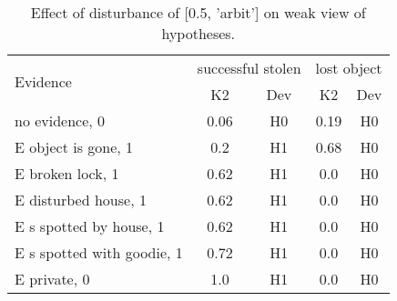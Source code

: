 \begin{table}\begin{tabular}{l|cc|cc}\toprule\multirow{2}{*}{Evidence} & \multicolumn{2}{c}{successful stolen}& \multicolumn{2}{c}{lost object}\\& {K2} & {Dev}& {K2} & {Dev}\\\midrule
no evidence, 0 & \cellcolor{Bittersweet}0.06&\cellcolor{Bittersweet}H0&\cellcolor{Bittersweet}0.19&\cellcolor{Bittersweet}H0\\E object is gone, 1 & \cellcolor{Bittersweet}0.2&\cellcolor{Bittersweet}H1&\cellcolor{Bittersweet}0.68&\cellcolor{Bittersweet}H0\\E broken lock, 1 & \cellcolor{Bittersweet}0.62&\cellcolor{Bittersweet}H1&\cellcolor{Bittersweet}0.0&\cellcolor{Bittersweet}H0\\E disturbed house, 1 & \cellcolor{Bittersweet}0.62&\cellcolor{Bittersweet}H1&\cellcolor{Bittersweet}0.0&\cellcolor{Bittersweet}H0\\E s spotted by house, 1 & \cellcolor{Bittersweet}0.62&\cellcolor{Bittersweet}H1&\cellcolor{Bittersweet}0.0&\cellcolor{Bittersweet}H0\\E s spotted with goodie, 1 & \cellcolor{Bittersweet}0.72&\cellcolor{Bittersweet}H1&\cellcolor{Bittersweet}0.0&\cellcolor{Bittersweet}H0\\E private, 0 & \cellcolor{Bittersweet}1.0&\cellcolor{Bittersweet}H1&\cellcolor{Bittersweet}0.0&\cellcolor{Bittersweet}H0\\\bottomrule\end{tabular}\caption{Effect of disturbance of [0.5, 'arbit'] on weak view of hypotheses.}\end{table}